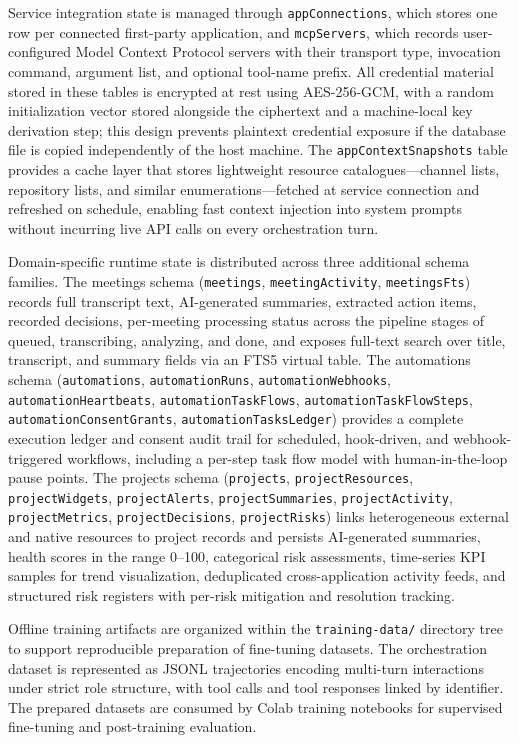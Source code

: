 \documentclass[conference]{IEEEtran}
\begin{document}
Service integration state is managed through \texttt{appConnections}, which stores one row per connected first-party application, and \texttt{mcpServers}, which records user-configured Model Context Protocol servers with their transport type, invocation command, argument list, and optional tool-name prefix. All credential material stored in these tables is encrypted at rest using AES-256-GCM, with a random initialization vector stored alongside the ciphertext and a machine-local key derivation step; this design prevents plaintext credential exposure if the database file is copied independently of the host machine. The \texttt{appContextSnapshots} table provides a cache layer that stores lightweight resource catalogues---channel lists, repository lists, and similar enumerations---fetched at service connection and refreshed on schedule, enabling fast context injection into system prompts without incurring live API calls on every orchestration turn.

Domain-specific runtime state is distributed across three additional schema families. The meetings schema (\texttt{meetings}, \texttt{meetingActivity}, \texttt{meetingsFts}) records full transcript text, AI-generated summaries, extracted action items, recorded decisions, per-meeting processing status across the pipeline stages of queued, transcribing, analyzing, and done, and exposes full-text search over title, transcript, and summary fields via an FTS5 virtual table. The automations schema (\texttt{automations}, \texttt{automationRuns}, \texttt{automationWebhooks}, \texttt{automationHeartbeats}, \texttt{automationTaskFlows}, \texttt{automationTaskFlowSteps}, \texttt{automationConsentGrants}, \texttt{automationTasksLedger}) provides a complete execution ledger and consent audit trail for scheduled, hook-driven, and webhook-triggered workflows, including a per-step task flow model with human-in-the-loop pause points. The projects schema (\texttt{projects}, \texttt{projectResources}, \texttt{projectWidgets}, \texttt{projectAlerts}, \texttt{projectSummaries}, \texttt{projectActivity}, \texttt{projectMetrics}, \texttt{projectDecisions}, \texttt{projectRisks}) links heterogeneous external and native resources to project records and persists AI-generated summaries, health scores in the range 0--100, categorical risk assessments, time-series KPI samples for trend visualization, deduplicated cross-application activity feeds, and structured risk registers with per-risk mitigation and resolution tracking.

Offline training artifacts are organized within the \texttt{training-data/} directory tree to support reproducible preparation of fine-tuning datasets. The orchestration dataset is represented as JSONL trajectories encoding multi-turn interactions under strict role structure, with tool calls and tool responses linked by identifier. The prepared datasets are consumed by Colab training notebooks for supervised fine-tuning and post-training evaluation.
\end{document}
